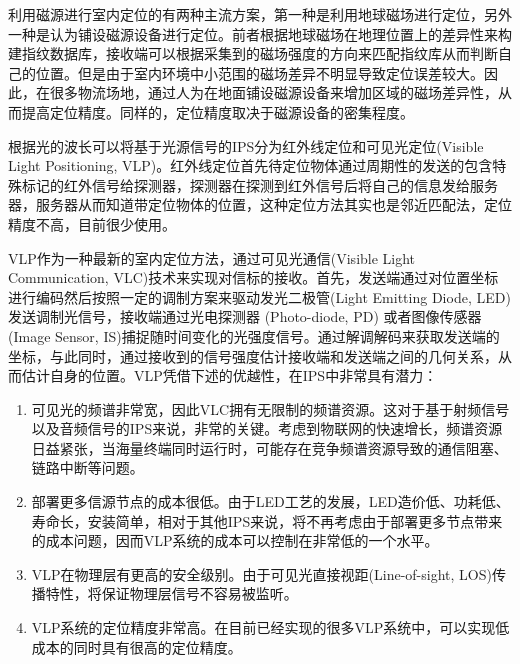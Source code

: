 利用磁源进行室内定位的有两种主流方案，第一种是利用地球磁场进行定位，另外一种是认为铺设磁源设备进行定位。前者根据地球磁场在地理位置上的差异性来构建指纹数据库，接收端可以根据采集到的磁场强度的方向来匹配指纹库从而判断自己的位置。但是由于室内环境中小范围的磁场差异不明显导致定位误差较大。因此，在很多物流场地，通过人为在地面铺设磁源设备来增加区域的磁场差异性，从而提高定位精度。同样的，定位精度取决于磁源设备的密集程度\cite{周家鹏2019地磁室内定位技术研究,ips-wang2023improved}。

根据光的波长可以将基于光源信号的IPS分为红外线定位和可见光定位(Visible Light Positioning, VLP)。红外线定位首先待定位物体通过周期性的发送的包含特殊标记的红外信号给探测器，探测器在探测到红外信号后将自己的信息发给服务器，服务器从而知道带定位物体的位置，这种定位方法其实也是邻近匹配法，定位精度不高，目前很少使用。

VLP作为一种最新的室内定位方法，通过可见光通信(Visible Light Communication, VLC)技术来实现对信标的接收\cite{vlp-abdalmajeed2023improved,vlp-sen20233d}。首先，发送端通过对位置坐标进行编码然后按照一定的调制方案来驱动发光二极管(Light Emitting Diode, LED)发送调制光信号，接收端通过光电探测器 (Photo-diode, PD) 或者图像传感器(Image Sensor, IS)捕捉随时间变化的光强度信号\cite{ips-pd-is-liu2022efficient}。通过解调解码来获取发送端的坐标，与此同时，通过接收到的信号强度估计接收端和发送端之间的几何关系，从而估计自身的位置。VLP凭借下述的优越性，在IPS中非常具有潜力：
\begin{enumerate}[topsep = 0 pt, itemsep= 0 pt, parsep=0pt, partopsep=0pt, leftmargin=20pt, itemindent=0pt, labelsep=6pt, label={(\arabic*)}] 

    \item 可见光的频谱非常宽，因此VLC拥有无限制的频谱资源。这对于基于射频信号以及音频信号的IPS来说，非常的关键。考虑到物联网的快速增长，频谱资源日益紧张，当海量终端同时运行时，可能存在竞争频谱资源导致的通信阻塞、链路中断等问题。
    \item 部署更多信源节点的成本很低。由于LED工艺的发展，LED造价低、功耗低、寿命长，安装简单，相对于其他IPS来说，将不再考虑由于部署更多节点带来的成本问题，因而VLP系统的成本可以控制在非常低的一个水平。
    \item VLP在物理层有更高的安全级别。由于可见光直接视距(Line-of-sight, LOS)传播特性，将保证物理层信号不容易被监听。
    \item VLP系统的定位精度非常高。在目前已经实现的很多VLP系统中，可以实现低成本的同时具有很高的定位精度。
\end{enumerate}

